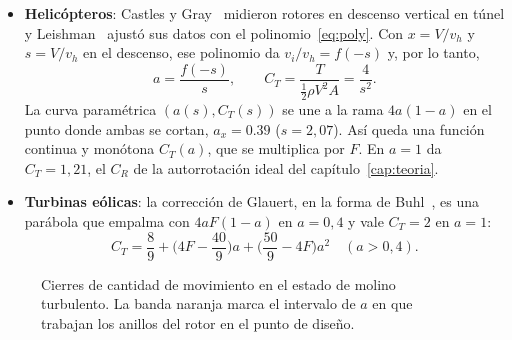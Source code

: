 \begin{itemize}
\item \textbf{Helicópteros}: Castles y Gray~\cite{castles1951} midieron rotores en
  descenso vertical en túnel y Leishman~\cite{leishman2006} ajustó sus datos con el
  polinomio~\eqref{eq:poly}. Con $x=V/v_h$ y $s=V/v_h$ en el descenso, ese polinomio da
  $v_i/v_h=f(-s)$ y, por lo tanto,
  \begin{equation}
    a=\frac{f(-s)}{s},\qquad C_T=\frac{T}{\tfrac12\rho V^2A}=\frac{4}{s^2}.
    \label{eq:bemt-heli}
  \end{equation}
  La curva paramétrica $(a(s),C_T(s))$ se une a la rama $4a(1-a)$ en el punto donde ambas
  se cortan, $a_x=\num{0.39}$ ($s=2{,}07$). Así queda una función continua y monótona
  $C_T(a)$, que se multiplica por $F$. En $a=1$ da $C_T=1{,}21$, el $C_R$ de la
  autorrotación ideal del capítulo~\ref{cap:teoria}.
\item \textbf{Turbinas eólicas}: la corrección de Glauert, en la forma de
  Buhl~\cite{bemt-buhl2005}, es una parábola que empalma con $4aF(1-a)$ en $a=0{,}4$ y
  vale $C_T=2$ en $a=1$:
  \begin{equation}
    C_T=\frac89+\Big(4F-\frac{40}{9}\Big)a+\Big(\frac{50}{9}-4F\Big)a^2 \quad (a>0{,}4).
    \label{eq:bemt-buhl}
  \end{equation}
\end{itemize}

\begin{figure}[H]
\centering
{}
\caption{Cierres de cantidad de movimiento en el estado de molino turbulento. La banda
naranja marca el intervalo de $a$ en que trabajan los anillos del rotor en el punto de
diseño.}
\label{fig:bemt-curvas}
\end{figure}

